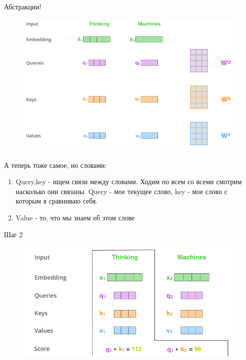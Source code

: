 \documentclass[notes,12pt, aspectratio=169]{beamer}
\begin{document}
\begin{frame}{Абстракции!}
\begin{figure}
	\centering
	\includegraphics[width=0.8\linewidth]{images/transformer_self_attention_vectors}
	\label{fig:seq2seq}
\end{figure}
\end{frame}


\begin{frame}
А теперь тоже самое, но словами:
\begin{enumerate}
	\item Query,key - ищем связи между словами. Ходим по всем со всеми смотрим насколько они связаны. Query - мое текущее слово, key - мое слово с которым я сравниваю себя.
	\item Value - то, что мы знаем об этом слове
\end{enumerate}
\end{frame}

\begin{frame}{Шаг 2}
\begin{figure}
	\centering
	\includegraphics[width=0.8\linewidth]{images/step_2}
	\label{fig:seq2seq}
\end{figure}
\end{frame}
\end{document}
